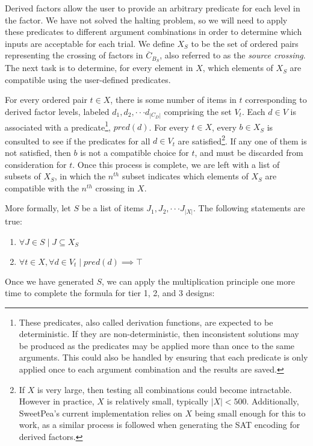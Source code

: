 Derived factors allow the user to provide an arbitrary predicate for each level in the factor. We have not solved the halting problem, so we will need to apply these predicates to different argument combinations in order to determine which inputs are acceptable for each trial. We define $X_S$ to be the set of ordered pairs representing the crossing of factors in $\overline{C}_{B_S}$, also referred to as the \textit{source crossing}. The next task is to determine, for every element in $X$, which elements of $X_S$ are compatible using the user-defined predicates.

For every ordered pair $t \in X$, there is some number of items in $t$ corresponding to derived factor levels, labeled $d_1, d_2, \cdot\cdot\cdot d_{|C_D|}$ comprising the set $V_t$. Each $d \in V$ is associated with a predicate\footnote{These predicates, also called derivation functions, are expected to be deterministic. If they are non-deterministic, then inconsistent solutions may be produced as the predicates may be applied more than once to the same arguments. This could also be handled by ensuring that each predicate is only applied once to each argument combination and the results are saved.}, $pred(d)$. For every $t \in X$, every $b \in X_S$ is consulted to see if the predicates for all $d \in V_t$ are satisfied\footnote{If $X$ is very large, then testing all combinations could become intractable. However in practice, $X$ is relatively small, typically $|X| < 500$. Additionally, SweetPea's current implementation relies on $X$ being small enough for this to work, as a similar process is followed when generating the SAT encoding for derived factors.}. If any one of them is not satisfied, then $b$ is not a compatible choice for $t$, and must be discarded from consideration for $t$. Once this process is complete, we are left with a list of subsets of $X_S$, in which the $n^{th}$ subset indicates which elements of $X_S$ are compatible with the $n^{th}$ crossing in $X$.

More formally, let $S$ be a list of items $J_1, J_2, \cdot\cdot\cdot J_{|X|}$. The following statements are true:

\begin{enumerate}
\item $\forall J \in S \mid J \subseteq X_S$
\item $\forall t \in X,  \forall d \in V_t \mid pred(d) \implies \top$
\end{enumerate}

Once we have generated $S$, we can apply the multiplication principle one more time to complete the formula for tier 1, 2, and 3 designs:

